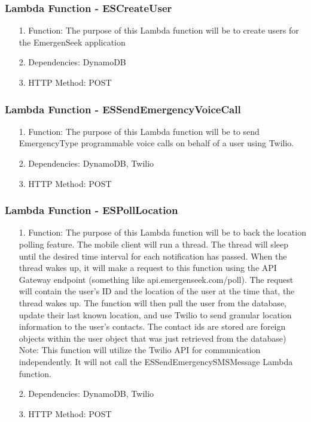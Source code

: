 \documentclass[10pt, a4paper]{article}
\begin{document}
\subsubsection{Lambda Function - ESCreateUser}
\begin{enumerate}
	\item[1.] Function: The purpose of this Lambda function will be to create users for the EmergenSeek application
	\item[2.] Dependencies: DynamoDB
	\item[3.] HTTP Method: POST
\end{enumerate}

\subsubsection{Lambda Function - ESSendEmergencyVoiceCall}
\begin{enumerate}
	\item[1.] Function: The purpose of this Lambda function will be to send EmergencyType programmable voice calls on behalf of a user using Twilio.
	\item[2.] Dependencies: DynamoDB, Twilio
	\item[3.] HTTP Method: POST
\end{enumerate}

\subsubsection{Lambda Function - ESPollLocation}
\begin{enumerate}
	\item[1.] Function: The purpose of this Lambda function will be to back the location polling feature. The mobile client will run a thread. The thread will sleep until the desired time interval for each notification has passed. When the thread wakes up, it will make a request to this function using the API Gateway endpoint (something like api.emergenseek.com/poll). The request will contain the user's ID and the location of the user at the time that, the thread wakes up. The function will then pull the user from the database, update their last known location, and use Twilio to send granular location information to the user's contacts. The contact ids are stored are foreign objects within the user object that was just retrieved from the database) Note: This function will utilize the Twilio API for communication independently. It will not call the ESSendEmergencySMSMessage Lambda function.
	\item[2.] Dependencies: DynamoDB, Twilio
	\item[3.] HTTP Method: POST
\end{enumerate}
\end{document}

